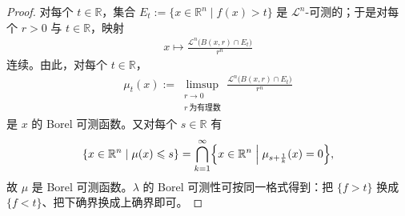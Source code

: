 \documentclass[../../main.tex]{subfiles}%
\begin{document}
\begin{proof}
对每个 $t\in\mathbb{R}$，集合 $E_t:=\{x\in\mathbb{R}^n\mid f(x)>t\}$ 是 $\mathcal{L}^n$-可测的；于是对每个 $r>0$ 与 $t\in\mathbb{R}$，映射
\begin{align*}
x\longmapsto\frac{\mathcal{L}^n\bigl(B(x,r)\cap E_t\bigr)}{r^n}
\end{align*}
连续。由此，对每个 $t\in\mathbb{R}$，
\begin{align*}
\mu_t(x):=\limsup_{\substack{r\to0\\ r\ \text{为有理数}}}\frac{\mathcal{L}^n\bigl(B(x,r)\cap E_t\bigr)}{r^n}
\end{align*}
是 $x$ 的 Borel 可测函数。又对每个 $s\in\mathbb{R}$ 有
\begin{align*}
\{x\in\mathbb{R}^n\mid\mu(x)\leqslant s\}=\bigcap_{k=1}^{\infty}\Bigl\{x\in\mathbb{R}^n\Bigm|\mu_{s+\frac1k}(x)=0\Bigr\},
\end{align*}
故 $\mu$ 是 Borel 可测函数。$\lambda$ 的 Borel 可测性可按同一格式得到：把 $\{f>t\}$ 换成 $\{f<t\}$、把下确界换成上确界即可。
\end{proof}
\end{document}

